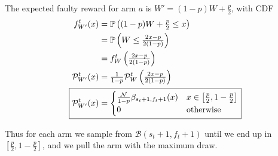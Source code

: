The expected faulty reward for arm $a$ is $W'=(1-p)W+\tfrac{p}{2}$, with CDF
\begin{align*}
    f_{W'}^t(x) &= \mathbb{P}\left((1-p)W+\tfrac{p}{2} \leq x\right) \\
    &= \mathbb{P}\left(W \leq \tfrac{2x - p}{2(1 - p)}\right) \\
    &= f_W^t\left(\tfrac{2x - p}{2(1 - p)}\right) \\
    \mathcal{P}_{W'}^t(x) &= \tfrac{1}{1 - p}\mathcal{P}_W^t\left(\tfrac{2x - p}{2(1 - p)}\right) \\
    \Aboxed{\mathcal{P}_{W'}^t(x) &= {\begin{cases}
        \tfrac{\mathcal{N}}{1 - p}\beta_{s_t+1, f_t+1}(x) & x\in\left[\tfrac{p}{2},1-\tfrac{p}{2}\right] \\
        0 & \text{otherwise}
    \end{cases}}}
\end{align*}

Thus for each arm we sample from $\mathcal{B}(s_t+1, f_t+1)$ until we end up in $\left[\tfrac{p}{2},1-\tfrac{p}{2}\right]$, and we pull the arm with the maximum draw.
